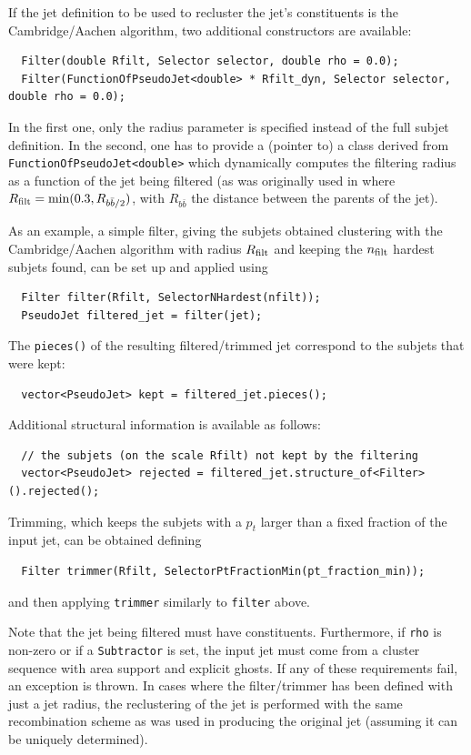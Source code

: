\documentclass[12pt,a4]{article}
\newcommand{\ttt}[1]{{\small\texttt{#1}}}
\begin{document}
If the jet definition to be used to recluster the jet's constituents is 
the Cambridge/Aachen algorithm, two additional constructors are available:
\begin{lstlisting}
  Filter(double Rfilt, Selector selector, double rho = 0.0);
  Filter(FunctionOfPseudoJet<double> * Rfilt_dyn, Selector selector, double rho = 0.0);
\end{lstlisting}
In the first one, only the radius parameter is specified instead of
the full subjet definition. 
In the second, one has to provide a
(pointer to) a class derived from \ttt{FunctionOfPseudoJet<double>}
which dynamically computes the filtering radius as a function of the
jet being filtered (as was originally used in \cite{BDRS} where
$R_{\rm filt}={\rm min}(0.3,R_{b\bar{b}/2})$, with $R_{b\bar b}$ the
distance between the parents of the jet). 

As an example, a simple filter, giving the subjets obtained clustering
with the Cambridge/Aachen algorithm with radius $R_{\rm filt}$ and
keeping the $n_{\rm filt}$ hardest subjets found, can be set up and applied using
\begin{lstlisting}
  Filter filter(Rfilt, SelectorNHardest(nfilt));
  PseudoJet filtered_jet = filter(jet);
\end{lstlisting}
The \ttt{pieces()} of the resulting
filtered/trimmed jet correspond to the subjets that were kept:
\begin{lstlisting}
  vector<PseudoJet> kept = filtered_jet.pieces();
\end{lstlisting} 
%
Additional structural information is available as follows:
% 
\begin{lstlisting}
  // the subjets (on the scale Rfilt) not kept by the filtering
  vector<PseudoJet> rejected = filtered_jet.structure_of<Filter>().rejected();
\end{lstlisting}

Trimming, which keeps the subjets with a $p_t$ larger than a fixed
fraction of the input jet, can be obtained defining
\begin{lstlisting}
  Filter trimmer(Rfilt, SelectorPtFractionMin(pt_fraction_min));
\end{lstlisting}
and then applying \ttt{trimmer} similarly to \ttt{filter} above.

Note that the jet being filtered must have constituents. Furthermore,
if \ttt{rho} is non-zero or if a \ttt{Subtractor} is set, the input
jet must come from a cluster sequence with area support and explicit
ghosts. If any of these requirements fail, an exception is thrown.
%
In cases where the filter/trimmer has been defined with just a jet
radius, the reclustering of the jet is performed with the same
recombination scheme as was used in producing the original jet
(assuming it can be uniquely determined).
\end{document}
